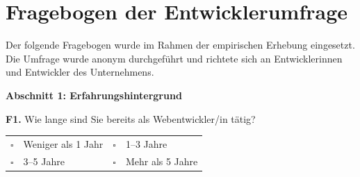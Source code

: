 
\clearpage
\appendix

% 
%
% 


\chapter{Fragebogen der Entwicklerumfrage}
\label{anhang:fragebogen}

Der folgende Fragebogen wurde im Rahmen der empirischen Erhebung eingesetzt.
Die Umfrage wurde anonym durchgef\"uhrt und richtete sich an Entwicklerinnen
und Entwickler des Unternehmens.

\bigskip

\noindent\textbf{Abschnitt 1: Erfahrungshintergrund}

\bigskip

\noindent\textbf{F1.} Wie lange sind Sie bereits als Webentwickler/in t\"atig?

\medskip
\begin{tabular}{@{}ll@{\qquad}ll@{}}
$\square$ & Weniger als 1 Jahr  & $\square$ & 1--3 Jahre \\[4pt]
$\square$ & 3--5 Jahre          & $\square$ & Mehr als 5 Jahre \\
\end{tabular}

